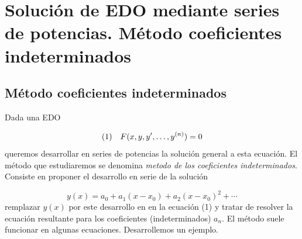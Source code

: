 \documentclass{article}
\newcounter{ejemplo_cont}
\begin{document}
\section{Solución de EDO mediante series de potencias. Método coeficientes indeterminados}



\subsection{Método coeficientes indeterminados}

Dada una EDO

\begin{equation} \hbox{(1)}\quad  F(x,y,y',\ldots,y^{(n)})=0\end{equation}
queremos desarrollar en series de potencias  la solución general a esta ecuación. El método que estudiaremos se denomina \emph{metodo de los coeficientes indeterminados}. Consiste en proponer el desarrollo en serie de la solución

\[y(x)=a_0+a_1(x-x_0)+a_2(x-x_0)^2+\cdots  \]
remplazar $y(x)$ por este desarrollo en  en la ecuación (1) y tratar de resolver la ecuación resultante para los coeficientes (indeterminados) $a_n$. El método suele funcionar en algunas ecuaciones. Desarrollemos un ejemplo.

 
\end{document}
